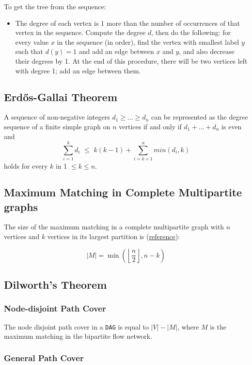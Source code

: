 To get the tree from the sequence:

\begin{itemize}
    \item The degree of each vertex is 1 more than the number of occurrences of that vertex in the sequence. Compute the degree $d$, then do the following: for every value $x$ in the sequence (in order), find the vertex with smallest label $y$ such that $d(y) = 1$ and add an edge between $x$ and $y$, and also decrease their degrees by 1. At the end of this procedure, there will be two vertices left with degree 1; add an edge between them.
\end{itemize}

\subsection{\texorpdfstring{Erd\H{o}s}{}-Gallai Theorem}
A sequence of non-negative integers $d_1 \geq ... \geq d_n$ can be represented as the degree sequence of a finite simple graph on $n$ vertices if and only if $d_1 + ... + d_n$ is even and
$$\sum_{i=1}^{k} d_i \,\, \leq \,\, k(k-1) + \sum_{i=k+1}^{n} min(d_i, k)$$
holds for every $k$ in 1 $\leq k \leq n$.

\subsection{Maximum Matching in Complete Multipartite graphs}

The size of the maximum matching in a complete multipartite graph with $n$ vertices and $k$ vertices in its largest partition is (\href{http://math.furman.edu/~mwoodard/fuejum/content/1996/1996paper2.pdf}{reference}):

$$ |M| = \min\left(\left\lfloor \frac{n}{2} \right\rfloor, n - k\right) $$

\subsection{Dilworth's Theorem}

\subsubsection{Node-disjoint Path Cover}

The node disjoint path cover in a {\tt DAG} is equal to $|V| - |M|$, where $M$ is the maximum matching in the bipartite flow network.

\subsubsection{General Path Cover}

